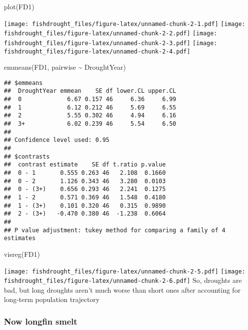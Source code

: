 \documentclass[
]{article}
\newenvironment{Shaded}{\begin{snugshade}}{\end{snugshade}}
\newcommand{\FunctionTok}[1]{\textcolor[rgb]{0.00,0.00,0.00}{#1}}
\newcommand{\NormalTok}[1]{#1}
\newcommand{\SpecialCharTok}[1]{\textcolor[rgb]{0.00,0.00,0.00}{#1}}
\begin{document}
\begin{Shaded}
\begin{Highlighting}[]
\FunctionTok{plot}\NormalTok{(FD1)}
\end{Highlighting}
\end{Shaded}

\texttt{[image: fishdrought\_files/figure-latex/unnamed-chunk-2-1.pdf]}
\texttt{[image: fishdrought\_files/figure-latex/unnamed-chunk-2-2.pdf]}
\texttt{[image: fishdrought\_files/figure-latex/unnamed-chunk-2-3.pdf]}
\texttt{[image: fishdrought\_files/figure-latex/unnamed-chunk-2-4.pdf]}

\begin{Shaded}
\begin{Highlighting}[]
\FunctionTok{emmeans}\NormalTok{(FD1, pairwise }\SpecialCharTok{\textasciitilde{}}\NormalTok{ DroughtYear)}
\end{Highlighting}
\end{Shaded}

\begin{verbatim}
## $emmeans
##  DroughtYear emmean    SE df lower.CL upper.CL
##  0             6.67 0.157 46     6.36     6.99
##  1             6.12 0.212 46     5.69     6.55
##  2             5.55 0.302 46     4.94     6.16
##  3+            6.02 0.239 46     5.54     6.50
## 
## Confidence level used: 0.95 
## 
## $contrasts
##  contrast estimate    SE df t.ratio p.value
##  0 - 1       0.555 0.263 46   2.108  0.1660
##  0 - 2       1.126 0.343 46   3.280  0.0103
##  0 - (3+)    0.656 0.293 46   2.241  0.1275
##  1 - 2       0.571 0.369 46   1.548  0.4180
##  1 - (3+)    0.101 0.320 46   0.315  0.9890
##  2 - (3+)   -0.470 0.380 46  -1.238  0.6064
## 
## P value adjustment: tukey method for comparing a family of 4 estimates
\end{verbatim}

\begin{Shaded}
\begin{Highlighting}[]
\FunctionTok{visreg}\NormalTok{(FD1)}
\end{Highlighting}
\end{Shaded}

\texttt{[image: fishdrought\_files/figure-latex/unnamed-chunk-2-5.pdf]}
\texttt{[image: fishdrought\_files/figure-latex/unnamed-chunk-2-6.pdf]}
So, droughts are bad, but long droughts aren't much worse than short
ones after accounting for long-term population trajectory

\hypertarget{now-longfin-smelt}{%
\subsubsection{Now longfin smelt}\label{now-longfin-smelt}}
\end{document}
